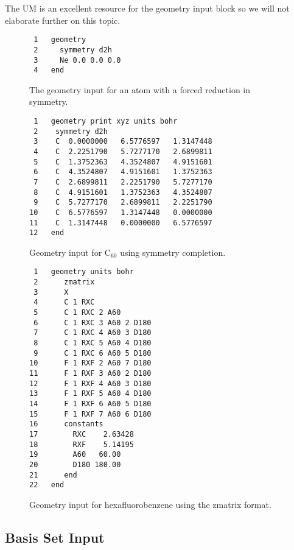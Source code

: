 \documentclass[letterpaper,12pt]{article}
\begin{document}
The UM is an excellent resource for the geometry input block so we will not elaborate further on this topic.

\begin{figure}
    \caption{The geometry input for an atom with a forced reduction in symmetry.}
    \label{fig:NeonGeometry}
    \begin{verbatim}
 1   geometry
 2     symmetry d2h
 3     Ne 0.0 0.0 0.0
 4   end
    \end{verbatim}
\end{figure}

\begin{figure}
    \caption{Geometry input for C$_{60}$ using symmetry completion.}
    \label{fig:C60geometry}
    \begin{verbatim}
 1   geometry print xyz units bohr
 2    symmetry d2h
 3    C  0.0000000   6.5776597   1.3147448
 4    C  2.2251790   5.7277170   2.6899811
 5    C  1.3752363   4.3524807   4.9151601
 6    C  4.3524807   4.9151601   1.3752363
 7    C  2.6899811   2.2251790   5.7277170
 8    C  4.9151601   1.3752363   4.3524807
 9    C  5.7277170   2.6899811   2.2251790
10    C  6.5776597   1.3147448   0.0000000
11    C  1.3147448   0.0000000   6.5776597
12   end
    \end{verbatim}
\end{figure}

\begin{figure}
    \caption{Geometry input for hexafluorobenzene using the zmatrix format.}
    \label{fig:HexafluorobenzeneZMatrix}
    \begin{verbatim}
 1   geometry units bohr
 2      zmatrix
 3      X
 4      C 1 RXC
 5      C 1 RXC 2 A60
 6      C 1 RXC 3 A60 2 D180
 7      C 1 RXC 4 A60 3 D180
 8      C 1 RXC 5 A60 4 D180
 9      C 1 RXC 6 A60 5 D180
10      F 1 RXF 2 A60 7 D180
11      F 1 RXF 3 A60 2 D180
12      F 1 RXF 4 A60 3 D180
13      F 1 RXF 5 A60 4 D180
14      F 1 RXF 6 A60 5 D180
15      F 1 RXF 7 A60 6 D180
16      constants
17        RXC    2.63428
18        RXF    5.14195
19        A60   60.00
20        D180 180.00
21      end
22   end
    \end{verbatim}
\end{figure}

\newpage

\subsection{Basis Set Input}\label{sec:BasisSetInput}
\end{document}
